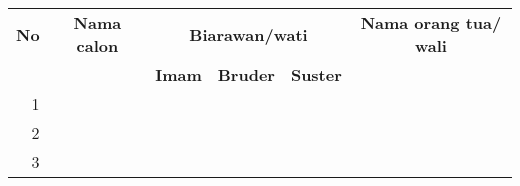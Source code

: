  \begin{longtable}{|r|l|l|l|l|l|} 
	\hline \hline 
	\multicolumn{1}{|c|}{\textbf{No}} & 
	\multicolumn{1}{|c|}{\textbf{Nama calon}} & 
	\multicolumn{3}{|c|}{\textbf{Biarawan/wati}} & 
	\multicolumn{1}{|c|}{\textbf{Nama orang tua/ wali}} \\ \cline{3-5}  
	&& \multicolumn{1}{|c|}{\textbf{Imam}} & 
	\multicolumn{1}{|c|}{\textbf{Bruder}} &  \multicolumn{1}{|c|}{\textbf{Suster}} & 
	\\  
	\hline \hline  \endfirsthead
1 &  & & & & \\ \hline 
2 &  & & & & \\ \hline 
3 &  & & & & \\ \hline 
\end{longtable}
